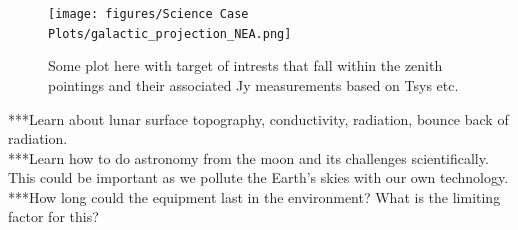 \begin{figure}[h]
    \centering
    \texttt{[image: figures/Science Case Plots/galactic\_projection\_NEA.png]}
    \caption{Some plot here with target of intrests that fall within the zenith pointings and their associated Jy measurements based on Tsys etc. }
    \label{fig:enter-label}
\end{figure}


***Learn about lunar surface topography, conductivity, radiation, bounce back of radiation.\\
***Learn how to do astronomy from the moon and its challenges scientifically.  This could be important as we pollute the Earth's skies with our own technology.\\
***How long could the equipment last in the environment? What is the limiting factor for this?


